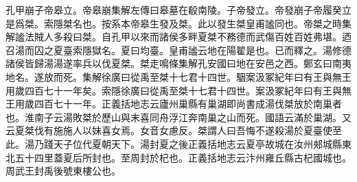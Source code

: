 孔甲崩子帝皋立。帝皋崩集解左傳曰皋墓在殽南陵。子帝發立。帝發崩子帝履癸立是爲桀。索隱桀名也。按系本帝皋生發及桀。此以發生桀皇甫謐同也。帝桀之時集解謐法賊人多殺曰桀。自孔甲以來而諸侯多畔夏桀不務德而武傷百姓百姓弗堪。迺召湯而囚之夏臺索隱獄名。夏曰均臺。皇甫謐云地在陽翟是也。已而釋之。湯修德諸侯皆歸湯湯遂率兵以伐夏桀。桀走鳴條集解孔安國曰地在安邑之西。鄭玄曰南夷地名。遂放而死。集解徐廣曰從禹至桀十七君十四世。駰案汲冢紀年曰有王與無王用歲四百七十一年矣。索隱徐廣曰從禹至桀十七君十四世。案汲冢紀年曰有王與無王用歲四百七十一年。正義括地志云廬州巢縣有巢湖即尚書成湯伐桀放於南巢者也。淮南子云湯敗桀於歷山與末喜同舟浮江奔南巢之山而死。國語云滿於巢湖。又云夏桀伐有施施人以妺喜女焉。女音女慮反。桀謂人曰吾悔不遂殺湯於夏臺使至此。湯乃踐天子位代夏朝天下。湯封夏之後正義括地志云夏亭故城在汝州郟城縣東北五十四里蓋夏后所封也。至周封於杞也。正義括地志云汴州雍丘縣古杞國城也。周武王封禹後號東樓公也。

